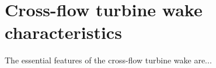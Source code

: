 \chapter{Cross-flow turbine wake characteristics}

The essential features of the cross-flow turbine wake are...